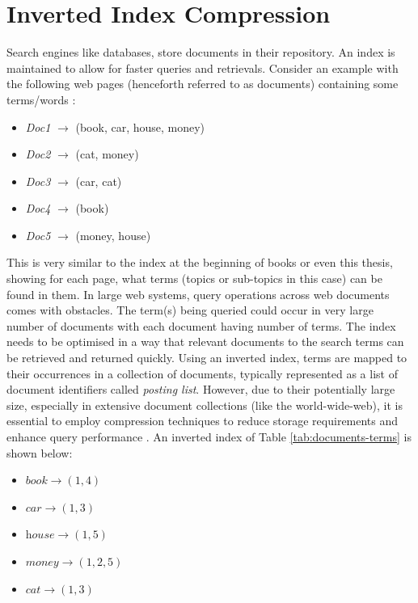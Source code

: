 \section{Inverted Index Compression}
Search engines like databases, store documents in their repository. An index is maintained to allow for faster queries and retrievals. Consider an example with the following web pages (henceforth referred to as documents) containing some terms/words :
\begin{table}[H]
    \begin{itemize}
        \item \textit{Doc1} $\rightarrow$  (book, car, house, money)
        \item \textit{Doc2} $\rightarrow$  (cat, money)
        \item \textit{Doc3} $\rightarrow$  (car, cat)
        \item \textit{Doc4} $\rightarrow$  (book)
        \item \textit{Doc5} $\rightarrow$  (money, house)
    \end{itemize}
    \caption{Documents with their set of terms}
    \label{tab:documents-terms}
\end{table}
This is very similar to the index at the beginning of books or even this thesis, showing for each page, what terms (topics or sub-topics in this case) can be found in them. In large web systems, query operations across web documents comes with obstacles. The term(s) being queried could occur in very large number of documents with each document having number of terms. The index needs to be optimised in a way that relevant documents to the search terms can be retrieved and returned quickly. Using an inverted index, terms are mapped to their occurrences in a collection of documents, typically represented as a list of document identifiers called \textit{posting list}. However, due to their potentially large size, especially in extensive document collections (like the world-wide-web), it is essential to employ compression techniques to reduce storage requirements and enhance query performance \cite{Buettcher_2010, Manning_2008}. An inverted index of Table \ref{tab:documents-terms} is shown below:\par
\begin{table}[H]
    \begin{itemize}
        \item $\textit{book} \rightarrow (1, 4)$
        \item $\textit{car} \rightarrow (1, 3)$
        \item $\textit{house} \rightarrow (1, 5)$
        \item $\textit{money} \rightarrow (1, 2, 5)$
        \item $\textit{cat} \rightarrow (1, 3)$
    \end{itemize}
    \caption{Inverted list of terms with the occurrences as document id}
    \label{tab:inverted-index}
\end{table}
